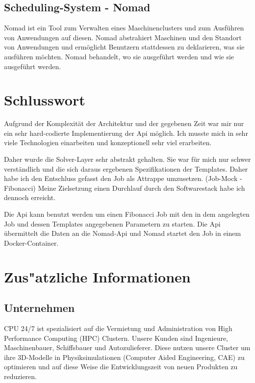 \documentclass[12pt]{article}
\begin{document}
\subsection{Scheduling-System - Nomad \cite{NOMAD}}

Nomad ist ein Tool zum Verwalten eines Maschinenclusters und zum Ausführen von Anwendungen auf diesen. Nomad abstrahiert Maschinen und den Standort von Anwendungen und ermöglicht Benutzern stattdessen zu deklarieren, was sie ausführen möchten. Nomad behandelt, wo sie ausgeführt werden und wie sie ausgeführt werden.

\newpage


\section{Schlusswort}

Aufgrund der Komplexität der Architektur und der gegebenen Zeit war mir nur ein sehr hard-codierte Implementierung der Api möglich. Ich musste mich in sehr viele Technologien einarbeiten und konzeptionell sehr viel erarbeiten.

Daher wurde die Solver-Layer sehr abstrakt gehalten. Sie war für mich nur schwer verständlich und die sich daraus ergebenen Spezifikationen der Templates. Daher habe ich den Entschluss gefasst den Job als Attrappe umzusetzen. (Job-Mock - Fibonacci) Meine Zielsetzung einen Durchlauf durch den Softwarestack habe ich dennoch erreicht.

Die Api kann benutzt werden um einen Fibonacci Job mit den in dem angelegten Job und dessen Templates angegebenen Parametern zu starten. Die Api übermittelt die Daten an die Nomad-Api und Nomad startet den Job in einem Docker-Container.





\newpage

\section{Zus"atzliche Informationen}
\subsection{Unternehmen}

CPU 24/7 ist spezialisiert auf die Vermietung und Administration
von High Performance Computing (HPC) Clustern.
Unsere Kunden sind Ingenieure, Maschinenbauer, Schiffsbauer und Autozulieferer.
Diese nutzen unsere Cluster um ihre 3D-Modelle in Physiksimulationen (Computer Aided Engineering, CAE)
zu optimieren und auf diese Weise die Entwicklungszeit von neuen Produkten zu reduzieren.
\end{document}
